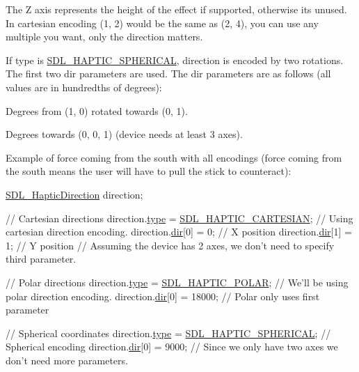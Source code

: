 The Z axis represents the height of the effect if supported, otherwise it\textquotesingle{}s unused. In cartesian encoding (1, 2) would be the same as (2, 4), you can use any multiple you want, only the direction matters.

If type is \hyperlink{_s_d_l__haptic_8h_a1fcf7cb0eaf3c39b16ba266054e25aff}{S\+D\+L\+\_\+\+H\+A\+P\+T\+I\+C\+\_\+\+S\+P\+H\+E\+R\+I\+C\+AL}, direction is encoded by two rotations. The first two {\ttfamily dir} parameters are used. The {\ttfamily dir} parameters are as follows (all values are in hundredths of degrees)\+:
\begin{DoxyItemize}
\item Degrees from (1, 0) rotated towards (0, 1).
\item Degrees towards (0, 0, 1) (device needs at least 3 axes).
\end{DoxyItemize}

Example of force coming from the south with all encodings (force coming from the south means the user will have to pull the stick to counteract)\+: 
\begin{DoxyCode}
\hyperlink{struct_s_d_l___haptic_direction}{SDL\_HapticDirection} direction;

\textcolor{comment}{// Cartesian directions}
direction.\hyperlink{struct_s_d_l___haptic_direction_acd6830ad68c4ba2af16057fa418087cc}{type} = \hyperlink{_s_d_l__haptic_8h_af8b2430a363a968de2a5b64c8f663d3b}{SDL\_HAPTIC\_CARTESIAN}; \textcolor{comment}{// Using cartesian direction encoding.}
direction.\hyperlink{struct_s_d_l___haptic_direction_a6cebd8118a3e61e36bd0c503ae020362}{dir}[0] = 0; \textcolor{comment}{// X position}
direction.\hyperlink{struct_s_d_l___haptic_direction_a6cebd8118a3e61e36bd0c503ae020362}{dir}[1] = 1; \textcolor{comment}{// Y position}
\textcolor{comment}{// Assuming the device has 2 axes, we don't need to specify third parameter.}

\textcolor{comment}{// Polar directions}
direction.\hyperlink{struct_s_d_l___haptic_direction_acd6830ad68c4ba2af16057fa418087cc}{type} = \hyperlink{_s_d_l__haptic_8h_acdc35e97e5525472054a67b76e518f3b}{SDL\_HAPTIC\_POLAR}; \textcolor{comment}{// We'll be using polar direction encoding.}
direction.\hyperlink{struct_s_d_l___haptic_direction_a6cebd8118a3e61e36bd0c503ae020362}{dir}[0] = 18000; \textcolor{comment}{// Polar only uses first parameter}

\textcolor{comment}{// Spherical coordinates}
direction.\hyperlink{struct_s_d_l___haptic_direction_acd6830ad68c4ba2af16057fa418087cc}{type} = \hyperlink{_s_d_l__haptic_8h_a1fcf7cb0eaf3c39b16ba266054e25aff}{SDL\_HAPTIC\_SPHERICAL}; \textcolor{comment}{// Spherical encoding}
direction.\hyperlink{struct_s_d_l___haptic_direction_a6cebd8118a3e61e36bd0c503ae020362}{dir}[0] = 9000; \textcolor{comment}{// Since we only have two axes we don't need more parameters.}
\end{DoxyCode}


